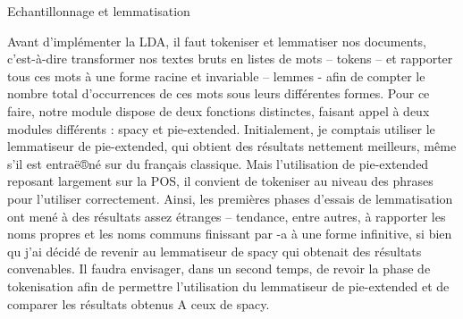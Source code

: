 \documentclass[letterpaper,portrait,12pt]{article}
\begin{document}
	Echantillonnage et lemmatisation





	Avant d'impl\'{e}menter la LDA, il faut tokeniser et lemmatiser nos documents, c'est-\`{a}-dire transformer nos textes bruts en listes de mots -- tokens -- et rapporter tous ces mots \`{a} une forme racine et invariable -- lemmes - afin de compter le nombre total d'occurrences de ces mots sous leurs diff\'{e}rentes formes. Pour ce faire, notre module dispose de deux fonctions distinctes, faisant appel \`{a} deux modules diff\'{e}rents : spacy et pie-extended. Initialement, je comptais utiliser le lemmatiseur de pie-extended, qui obtient des r\'{e}sultats nettement meilleurs, m\^{e}me s'il est entra\"{e}®n\'{e} sur du fran\c{c}ais classique. Mais l'utilisation de pie-extended reposant largement sur la POS, il convient de tokeniser au niveau des phrases pour l'utiliser correctement. Ainsi, les premi\`{e}res phases d'essais de lemmatisation ont men\'{e} \`{a} des r\'{e}sultats assez \'{e}tranges -- tendance, entre autres, \`{a} rapporter les noms propres et les noms communs finissant par -a \`{a} une forme infinitive, si bien qu j'ai d\'{e}cid\'{e} de revenir au lemmatiseur de spacy qui obtenait des r\'{e}sultats convenables. Il faudra envisager, dans un second temps, de revoir la phase de tokenisation afin de permettre l'utilisation du lemmatiseur de pie-extended et de comparer les r\'{e}sultats obtenus A ceux de spacy. 
\end{document}
